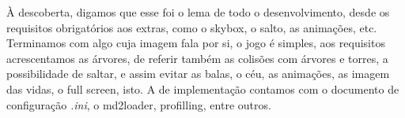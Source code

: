 À descoberta, digamos que esse foi o lema de todo o desenvolvimento, desde os requisitos obrigatórios aos extras, como o skybox, o salto, as animações, etc. Terminamos com algo cuja imagem fala por si, o jogo é simples, aos requisitos acrescentamos as árvores, de referir também as colisões com árvores e torres, a possibilidade de saltar, e assim evitar as balas, o céu, as animações, as imagem das vidas, o full screen, isto.
A de implementação contamos com o documento de configuração \textit{.ini}, o md2loader, profilling, entre outros.
